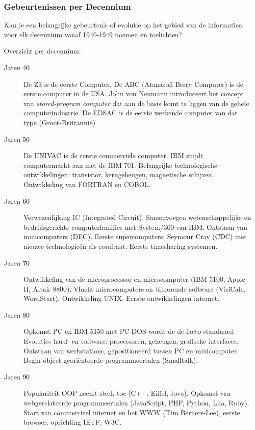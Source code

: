 \documentclass[../main.tex]{subfiles}
\begin{document}
\subsubsection{Gebeurtenissen per Decennium}
\begin{question}
Kan je een belangrijke gebeurtenis of evolutie op het gebied van de informatica voor elk decennium vanaf 1940-1949 noemen en toelichten?
\end{question}
\begin{solution}
Overzicht per decennium:
\begin{description}
	\item[Jaren 40] De Z3 is de eerste Computer. De ABC (Atanasoff Berry Computer) is de eerste computer in de USA. John von Neumann introduceert het concept van \emph{stored-program computer} dat aan de basis komt te liggen van de gehele computerindustrie. De EDSAC is de eerste werkende computer van dat type (Groot-Brittanni\"e)
	\item[Jaren 50] De UNIVAC is de eerste commerci\"ele computer. IBM snijdt computermarkt aan met de IBM 701. Belangrijke technologische ontwikkelingen: transistor, kerngeheugen, magnetische schijven. Ontwikkeling van FORTRAN en COBOL.
	\item[Jaren 60] Verwezenlijking IC (Integrated Circuit). Samenvoegen wetenschappelijke en bedrijfsgerichte computerfamilies met System/360 van IBM. Ontstaan van minicomputers (DEC). Eerste supercomputers: Seymour Cray (CDC) met nieuwe technologie\"en als resultaat. Eerste timesharing systemen.
	\item[Jaren 70] Ontwikkeling van de microprocessor en microcomputer (IBM 5100, Apple II, Altair 8800). Vlucht microcomputers en bijhorende software (VisiCalc, WordStart). Ontwikkeling UNIX. Eerste ontwikkelingen internet.
	\item[Jaren 80] Opkomst PC en IBM 5150 met PC-DOS wordt de de-facto standaard. Evoluties hard- en software: processoren, geheugen, grafische interfaces. Ontstaan van werkstations, gepositioneerd tussen PC en minicomputer. Begin object geori\"enteerde programmeertalen (Smalltalk).
	\item[Jaren 90] Populariteit OOP neemt sterk toe (C++, Eiffel, Java). Opkomst van webgerelateerde programmeertalen (JavaScript, PHP, Python, Lua, Ruby). Start van commercieel internet en het WWW (Tim Berners-Lee), eerste browser, oprichting IETF, W3C.
\end{description}
\end{solution}
\end{document}
